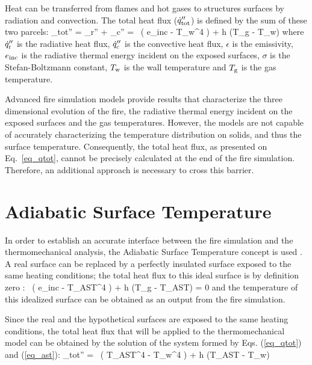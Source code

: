 \documentclass[11pt]{book}
\begin{document}
Heat can be transferred from flames and hot gases to structures surfaces by radiation and convection. The total heat flux ($\dot{q}_{\rm tot}''$) is defined by the sum of these two parcels: 
\be \label{eq_qtot} _{\rm tot}'' = _{\rm r}'' + _{\rm c}'' = \epsilon \, \left( {e}_{\rm inc} - \sigma T_{\rm w}^4 \right) + h (T_{\rm g} - T_{\rm w})  \ee  
where $\dot{q}_{\rm r}''$ is the radiative heat flux, $\dot{q}_{\rm c}''$ is the convective heat flux, $\epsilon$ is the emissivity, ${e}_{\rm inc}$ is the radiative thermal energy incident on the exposed surfaces, $\sigma$ is the Stefan-Boltzmann constant, $T_{\rm w}$ is the wall temperature and $T_{\rm g}$ is the gas temperature.

Advanced fire simulation models provide results that characterize the three dimensional evolution of the fire, the radiative thermal energy incident on the exposed surfaces and the gas temperatures. However, the models are not capable of accurately characterizing the temperature distribution on solids, and thus the surface temperature. Consequently, the total heat flux, as presented on Eq.~\ref{eq_qtot}, cannot be precisely calculated at the end of the fire simulation. Therefore, an additional approach is necessary to cross this barrier.

\section{Adiabatic Surface Temperature}

In order to establish an accurate interface between the fire simulation and the thermomechanical analysis, the Adiabatic Surface Temperature concept is used \cite{Wickstrom:Interflam2007}. A real surface can be replaced by a perfectly insulated surface exposed to the same heating conditions; the total heat flux to this ideal surface is by definition zero :
\be \label{eq_ast} \epsilon \, \left( {e}_{\rm inc} - \sigma T_{\hbox{\tiny AST}}^4 \right) + h (T_{\rm g} - T_{\hbox{\tiny AST}}) = 0  \ee 
and the temperature of this idealized surface can be obtained as an output from the fire simulation.

Since the real and the hypothetical surfaces are exposed to the same heating conditions, the total heat flux that will be applied to the thermomechanical model can be obtained by the solution of the system formed by Eqs. (\ref{eq_qtot}) and (\ref{eq_ast}):
\be \label{eq_ftmi}_{\rm tot}'' = \epsilon \sigma \, \left( T_{\hbox{\tiny AST}}^4 - T_{\rm w}^4 \right) + h (T_{\hbox{\tiny AST}} - T_{\rm w})  \ee
\end{document}
